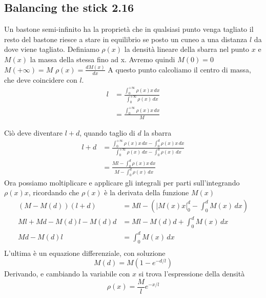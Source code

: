 \documentclass{article}
\begin{document}
\subsection{Balancing the stick 2.16}
Un bastone semi-infinito ha la proprietà che in qualsiasi punto venga tagliato il resto del bastone 
riesce a stare in equilibrio se posto un cuneo a una distanza $l$ da dove viene tagliato.
Definiamo $\rho(x)$ la densità lineare della sbarra nel punto $x$ e $M(x)$ la massa della stessa fino ad x. 
Avremo quindi $M(0) = 0$ $M(+\infty) = M$ $\rho(x) = \frac{dM(x)}{dx}$
A questo punto calcoliamo il centro di massa, che deve coincidere con $l$.
\begin{equation}
    \begin{aligned}
        l &= \frac{ \int_{0}^{+\infty} \rho(x) x \,dx }{ \int_{0}^{+\infty} \rho(x) \,dx }\\
         &= \frac{ \int_{0}^{+\infty} \rho(x) x \,dx }{M}
    \end{aligned}
\end{equation}

Ciò deve diventare $l+d$, quando taglio di $d$ la sbarra
\begin{equation}
    \begin{aligned}
        l + d &= \frac{ \int_{0}^{+\infty} \rho(x) x \,dx - \int_{0}^{d} \rho(x) x \,dx }{  \int_{0}^{+\infty} \rho(x) \,dx - \int_{0}^{d} \rho(x) \,dx }\\
         &= \frac{ Ml - \int_{0}^{d} \rho(x) x \,dx }{M -  \int_{0}^{d} \rho(x) \,dx }
    \end{aligned}
\end{equation}
Ora possiamo moltiplicare e applicare gli integrali per parti sull'integrando $\rho(x) x$, ricordando che $\rho(x)$ è la derivata della funzione $M(x)$
\begin{equation}
    \begin{aligned}
        (M -  M(d) )(l + d) &=  Ml - (|M(x)x|_0^{d} - \int_{0}^{d} M(x) \,dx) \\
        Ml + Md - M(d)l - M(d)d &=  Ml - M(d)d + \int_{0}^{d} M(x) \,dx \\
        Md - M(d)l &= \int_{0}^{d} M(x) \,dx \\
    \end{aligned}
\end{equation}
L'ultima è un equazione differenziale, con soluzione
\begin{equation}
    M(d) = M(1 - e^{-d/l})
\end{equation}
Derivando, e cambiando la variabile con $x$ si trova l'espressione della densità
\begin{equation}
    \rho(x) = \frac{M}{l} e^{-x/l}
\end{equation}
\end{document}
